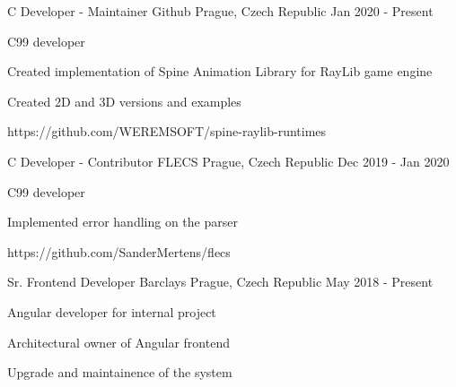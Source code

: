 

\begin{cventries}

    \cventry
    {C Developer - Maintainer} %
    {Github} %
    {Prague, Czech Republic} %
    {Jan 2020 - Present} %
    {
    \begin{cvitems} %
        \item {C99 developer}
        \item {Created implementation of Spine Animation Library for RayLib game engine}
        \item {Created 2D and 3D versions and examples}
        \item {https://github.com/WEREMSOFT/spine-raylib-runtimes}
    \end{cvitems}
    }

    \cventry
    {C Developer - Contributor} %
    {FLECS} %
    {Prague, Czech Republic} %
    {Dec 2019 - Jan 2020} %
    {
    \begin{cvitems} %
        \item {C99 developer}
        \item {Implemented error handling on the parser}
        \item {https://github.com/SanderMertens/flecs}
    \end{cvitems}
    }

    \cventry
    {Sr. Frontend Developer} %
    {Barclays} %
    {Prague, Czech Republic} %
    {May 2018 - Present} %
    {
    \begin{cvitems} %
        \item {Angular developer for internal project}
        \item {Architectural owner of Angular frontend}
        \item {Upgrade and maintainence of the system}
    \end{cvitems}
    }


\end{cventries}
